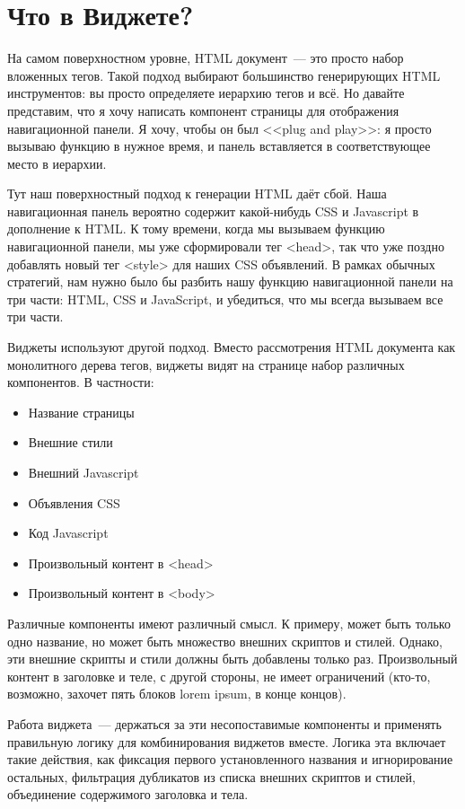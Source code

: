 \section{Что в Виджете?}
На самом поверхностном уровне, HTML документ~--- это просто набор вложенных тегов. Такой подход выбирают большинство генерирующих HTML инструментов: вы просто определяете иерархию тегов и всё. Но давайте представим, что я хочу написать компонент страницы для отображения навигационной панели. Я хочу, чтобы он был <<plug and play>>: я просто вызываю функцию в нужное время, и панель вставляется в соответствующее место в иерархии.

Тут наш поверхностный подход к генерации HTML даёт сбой. Наша навигационная панель вероятно содержит какой-нибудь CSS и Javascript в дополнение к HTML. К тому времени, когда мы вызываем функцию навигационной панели, мы уже сформировали тег <head>, так что уже поздно добавлять новый тег <style> для наших CSS объявлений. В рамках обычных стратегий, нам нужно было бы разбить нашу функцию навигационной панели на три части: HTML, CSS и JavaScript, и убедиться, что мы всегда вызываем все три части.

Виджеты используют другой подход. Вместо рассмотрения HTML документа как монолитного дерева тегов, виджеты видят на странице набор различных компонентов. В частности:
\begin{itemize}
  \item Название страницы
  \item Внешние стили
  \item Внешний Javascript
  \item Объявления CSS
  \item Код Javascript
  \item Произвольный контент в <head>
  \item Произвольный контент в <body>
\end{itemize}

Различные компоненты имеют различный смысл. К примеру, может быть только одно название, но может быть множество внешних скриптов и стилей. Однако, эти внешние скрипты и стили должны быть добавлены только раз. Произвольный контент в заголовке и теле, с другой стороны, не имеет ограничений (кто-то, возможно, захочет пять блоков lorem ipsum, в конце концов).

Работа виджета~--- держаться за эти несопоставимые компоненты и применять правильную логику для комбинирования виджетов вместе. Логика эта включает такие действия, как фиксация первого установленного названия и игнорирование остальных, фильтрация дубликатов из списка внешних скриптов и стилей, объединение содержимого заголовка и тела.

